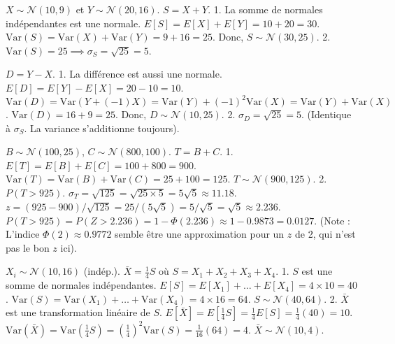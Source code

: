 \begin{correctionbox}
$X \sim \mathcal{N}(10, 9)$ et $Y \sim \mathcal{N}(20, 16)$. $S = X+Y$.
1.  La somme de normales indépendantes est une normale.
    $E[S] = E[X] + E[Y] = 10 + 20 = 30$.
    $\text{Var}(S) = \text{Var}(X) + \text{Var}(Y) = 9 + 16 = 25$.
    Donc, $S \sim \mathcal{N}(30, 25)$.
2.  $\text{Var}(S) = 25 \implies \sigma_S = \sqrt{25} = 5$.
\end{correctionbox}

\begin{correctionbox}
$D = Y - X$.
1.  La différence est aussi une normale.
    $E[D] = E[Y] - E[X] = 20 - 10 = 10$.
    $\text{Var}(D) = \text{Var}(Y + (-1)X) = \text{Var}(Y) + (-1)^2 \text{Var}(X) = \text{Var}(Y) + \text{Var}(X)$.
    $\text{Var}(D) = 16 + 9 = 25$.
    Donc, $D \sim \mathcal{N}(10, 25)$.
2.  $\sigma_D = \sqrt{25} = 5$. (Identique à $\sigma_S$. La variance s'additionne toujours).
\end{correctionbox}

\begin{correctionbox}
$B \sim \mathcal{N}(100, 25)$, $C \sim \mathcal{N}(800, 100)$. $T = B+C$.
1.  $E[T] = E[B] + E[C] = 100 + 800 = 900$.
    $\text{Var}(T) = \text{Var}(B) + \text{Var}(C) = 25 + 100 = 125$.
    $T \sim \mathcal{N}(900, 125)$.
2.  $P(T > 925)$. $\sigma_T = \sqrt{125} = \sqrt{25 \times 5} = 5\sqrt{5} \approx 11.18$.
    $z = (925 - 900) / \sqrt{125} = 25 / (5\sqrt{5}) = 5/\sqrt{5} = \sqrt{5} \approx 2.236$.
    $P(T > 925) = P(Z > 2.236) = 1 - \Phi(2.236) \approx 1 - 0.9873 = 0.0127$.
    (Note : L'indice $\Phi(2) \approx 0.9772$ semble être une approximation pour un $z$ de 2, qui n'est pas le bon $z$ ici).
\end{correctionbox}

\begin{correctionbox}
$X_i \sim \mathcal{N}(10, 16)$ (indép.). $\bar{X} = \frac{1}{4} S$ où $S = X_1+X_2+X_3+X_4$.
1.  $S$ est une somme de normales indépendantes.
    $E[S] = E[X_1] + \dots + E[X_4] = 4 \times 10 = 40$.
    $\text{Var}(S) = \text{Var}(X_1) + \dots + \text{Var}(X_4) = 4 \times 16 = 64$.
    $S \sim \mathcal{N}(40, 64)$.
2.  $\bar{X}$ est une transformation linéaire de $S$.
    $E[\bar{X}] = E[\frac{1}{4}S] = \frac{1}{4}E[S] = \frac{1}{4}(40) = 10$.
    $\text{Var}(\bar{X}) = \text{Var}(\frac{1}{4}S) = (\frac{1}{4})^2 \text{Var}(S) = \frac{1}{16}(64) = 4$.
    $\bar{X} \sim \mathcal{N}(10, 4)$.
\end{correctionbox}

